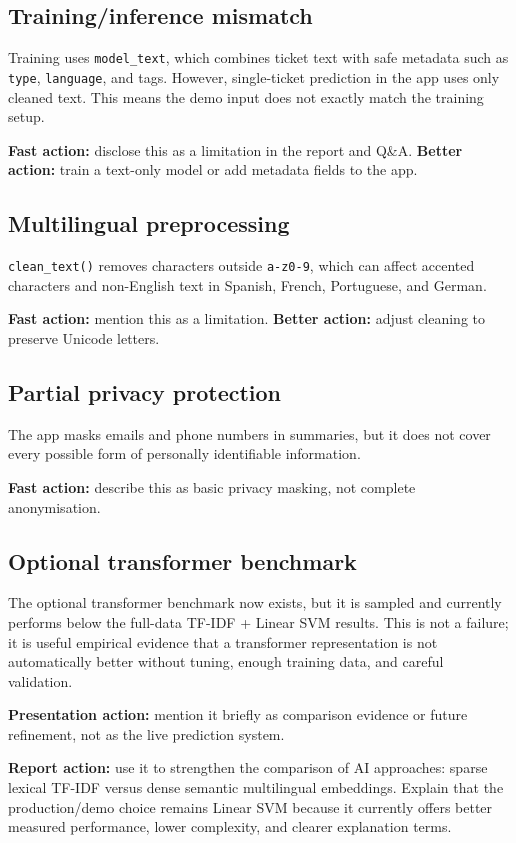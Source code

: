 \documentclass[11pt,a4paper]{article}
\begin{document}
\subsection{Training/inference mismatch}
Training uses \texttt{model\_text}, which combines ticket text with safe metadata such as \texttt{type}, \texttt{language}, and tags. However, single-ticket prediction in the app uses only cleaned text. This means the demo input does not exactly match the training setup.

\textbf{Fast action:} disclose this as a limitation in the report and Q\&A. \textbf{Better action:} train a text-only model or add metadata fields to the app.

\subsection{Multilingual preprocessing}
\texttt{clean\_text()} removes characters outside \texttt{a-z0-9}, which can affect accented characters and non-English text in Spanish, French, Portuguese, and German.

\textbf{Fast action:} mention this as a limitation. \textbf{Better action:} adjust cleaning to preserve Unicode letters.

\subsection{Partial privacy protection}
The app masks emails and phone numbers in summaries, but it does not cover every possible form of personally identifiable information.

\textbf{Fast action:} describe this as basic privacy masking, not complete anonymisation.

\subsection{Optional transformer benchmark}
The optional transformer benchmark now exists, but it is sampled and currently performs below the full-data TF-IDF + Linear SVM results. This is not a failure; it is useful empirical evidence that a transformer representation is not automatically better without tuning, enough training data, and careful validation.

\textbf{Presentation action:} mention it briefly as comparison evidence or future refinement, not as the live prediction system.

\textbf{Report action:} use it to strengthen the comparison of AI approaches: sparse lexical TF-IDF versus dense semantic multilingual embeddings. Explain that the production/demo choice remains Linear SVM because it currently offers better measured performance, lower complexity, and clearer explanation terms.
\end{document}
